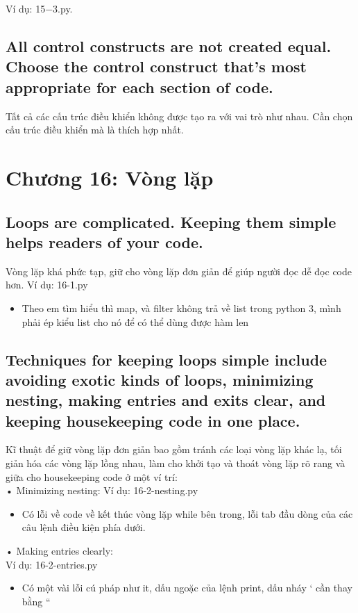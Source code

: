 \documentclass{article}
\begin{document}
    Ví dụ: 15$-$3.py.
    
    \subsection{All control constructs are not created equal. Choose the control construct that's most appropriate for each section of code.}
    Tất cả các cấu trúc điều khiển không được tạo ra với vai trò như nhau. Cần chọn cấu trúc điều khiển mà là thích hợp nhất.
    
\section{Chương 16: Vòng lặp}
    \subsection{Loops are complicated. Keeping them simple helps readers of your code.}
    Vòng lặp khá phức tạp, giữ cho vòng lặp đơn giản để giúp người đọc dễ đọc code hơn.
    Ví dụ: 16-1.py
    
    \begin{itemize}
        \item Theo em tìm hiểu thì map, và filter không trả về list trong python 3, mình phải ép kiểu list cho nó để có thể dùng được hàm len
    \end{itemize}
    
    \subsection{Techniques for keeping loops simple include avoiding exotic kinds of loops, minimizing nesting, making entries and exits clear, and keeping housekeeping code in one place.}
    
    Kĩ thuật để giữ vòng lặp đơn giản bao gồm tránh các loại vòng lặp khác lạ, tối giản hóa các vòng lặp lồng nhau, làm cho khởi tạo và thoát vòng lặp rõ rang và giữa cho housekeeping code ở một ví trí:\\
    • Minimizing nesting:
    Ví dụ: 16-2-nesting.py
    \begin{itemize}
        \item Có lỗi về code về kết thúc vòng lặp while bên trong, lỗi tab đầu dòng của các câu lệnh điều kiện phía dưới.
    \end{itemize}
    
    • Making entries clearly: \\
    Ví dụ: 16-2-entries.py
    \begin{itemize}
        \item Có một vài lỗi cú pháp như it, dấu ngoặc của lệnh print, dấu nháy ‘ cần thay bằng “
    \end{itemize}
    
\end{document}

